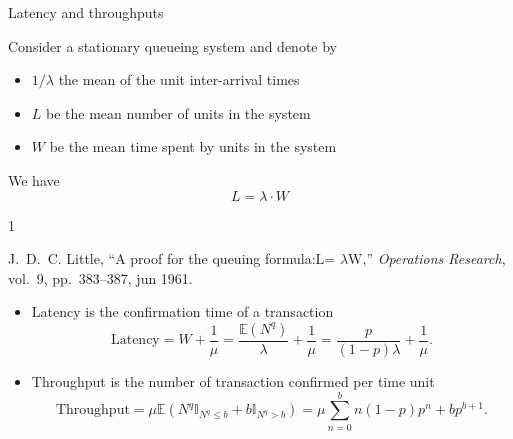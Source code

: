 \documentclass{beamer}
\begin{document}
\begin{frame}{Latency and throughputs}
\scriptsize

\begin{tcolorbox}[enhanced,drop shadow, title=Little's law]
Consider a stationary queueing system and denote by 
\begin{itemize}
  \item $1/\lambda$ the mean of the unit inter-arrival times
  \item $L$ be the mean number of units in the system
  \item $W$ be the mean time spent by units in the system
\end{itemize}
We have
$$
L = \lambda \cdot W
$$
\end{tcolorbox}
\tiny
\begin{thebibliography}{1}

J.~D.~C. Little, ``A proof for the queuing formula:{L}= $\lambda${W},'' {\em
  Operations Research}, vol.~9, pp.~383--387, jun 1961.

\end{thebibliography}
\scriptsize
\begin{itemize}
  \item Latency is the confirmation time of a transaction 
    $$
    \text{Latency} = W + \frac{1}{\mu} = \frac{\mathbb{E}(N^q)}{\lambda} + \frac{1}{\mu} =  \frac{p}{(1-p)\lambda} + \frac{1}{\mu}.
    $$
  \item Throughput is the number of transaction confirmed per time unit
  $$
    \text{Throughput} = \mu\mathbb{E}(N^q\mathbb{I}_{N^q\leq b}+b\mathbb{I}_{N^q> b}) = \mu\sum_{n = 0}^bn(1-p)p^n + bp^{b+1}.
  $$
\end{itemize}
\end{frame}
\end{document}
